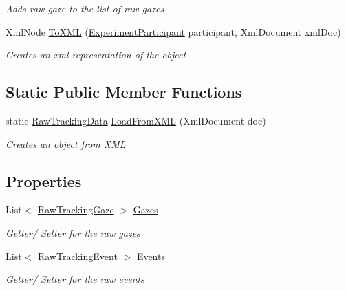 \begin{DoxyCompactItemize}
\begin{DoxyCompactList}\small\item\em Adds raw gaze to the list of raw gazes \end{DoxyCompactList}\item 
Xml\+Node \hyperlink{class_web_analyzer_1_1_models_1_1_base_1_1_raw_tracking_data_ae75cfde7e7b9a1e236b99c3f07f7487e}{To\+X\+M\+L} (\hyperlink{class_web_analyzer_1_1_models_1_1_base_1_1_experiment_participant}{Experiment\+Participant} participant, Xml\+Document xml\+Doc)
\begin{DoxyCompactList}\small\item\em Creates an xml representation of the object \end{DoxyCompactList}\end{DoxyCompactItemize}
\subsection*{Static Public Member Functions}
\begin{DoxyCompactItemize}
\item 
static \hyperlink{class_web_analyzer_1_1_models_1_1_base_1_1_raw_tracking_data}{Raw\+Tracking\+Data} \hyperlink{class_web_analyzer_1_1_models_1_1_base_1_1_raw_tracking_data_a9fb7d2281fb635efb2779dc6e502cb9e}{Load\+From\+X\+M\+L} (Xml\+Document doc)
\begin{DoxyCompactList}\small\item\em Creates an object from X\+M\+L \end{DoxyCompactList}\end{DoxyCompactItemize}
\subsection*{Properties}
\begin{DoxyCompactItemize}
\item 
List$<$ \hyperlink{class_web_analyzer_1_1_models_1_1_base_1_1_raw_tracking_gaze}{Raw\+Tracking\+Gaze} $>$ \hyperlink{class_web_analyzer_1_1_models_1_1_base_1_1_raw_tracking_data_a709969dfa88f800747d1bbabbdfb334e}{Gazes}
\begin{DoxyCompactList}\small\item\em Getter/ Setter for the raw gazes \end{DoxyCompactList}\item 
List$<$ \hyperlink{class_web_analyzer_1_1_models_1_1_base_1_1_raw_tracking_event}{Raw\+Tracking\+Event} $>$ \hyperlink{class_web_analyzer_1_1_models_1_1_base_1_1_raw_tracking_data_a288234f675cdfe067ec0667aa2be36c3}{Events}
\begin{DoxyCompactList}\small\item\em Getter/ Setter for the raw events \end{DoxyCompactList}\end{DoxyCompactItemize}
